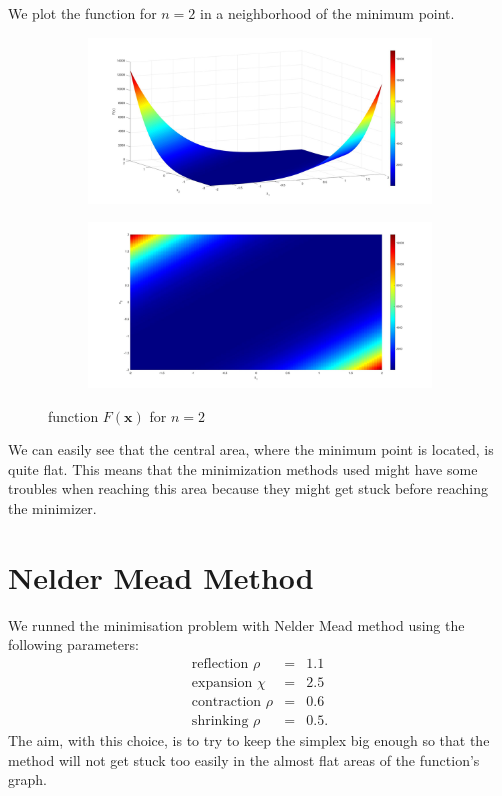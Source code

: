We plot the function for $n=2$ in a neighborhood of the minimum point.
\begin{figure}[H]
    \centering
    \begin{subfigure}{0.45\textwidth}
        \centering
        \includegraphics[width=\textwidth]{img/function_pb75_angolo1.jpg}
        \caption{}
    \end{subfigure}
    \begin{subfigure}{0.45\textwidth}
        \centering
        \includegraphics[width=\textwidth]{img/function_pb75_angolo2.jpg}
        \caption{}
    \end{subfigure}
    \caption{function $F(\boldsymbol{x})$ for $n=2$}
\end{figure}
We can easily see that the central area, where the minimum point is located,
is quite flat. This means that the minimization methods used might have some troubles
when reaching this area because they might get stuck before reaching the minimizer.

\section*{Nelder Mead Method}
We runned the minimisation problem with Nelder Mead method using the following parameters:
\begin{eqnarray*}
    \text{reflection } \rho &=& 1.1 \\
    \text{expansion } \chi &=& 2.5 \\
    \text{contraction } \rho &=& 0.6 \\
    \text{shrinking } \rho &=& 0.5.
\end{eqnarray*}
The aim, with this choice, is to try to keep the simplex big enough so that
the method will not get stuck too easily in the almost flat areas of the function's graph.

